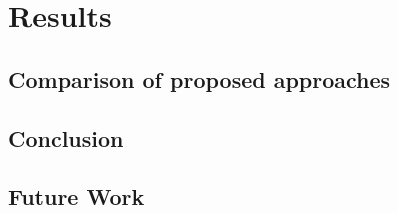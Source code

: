 \chapter{Results}
\section{Comparison of proposed approaches}
\section{Conclusion}
\section{Future Work}